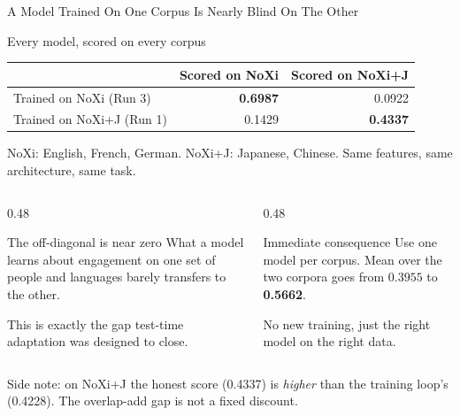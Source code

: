 \documentclass[aspectratio=169]{beamer}
\newcommand{\hl}[1]{\textcolor{coolpurple}{\textbf{#1}}}
\begin{document}
	\begin{frame}{A Model Trained On One Corpus Is Nearly Blind On The Other}
		\begin{block}{Every model, scored on every corpus}
			\small
			\centering
			\begin{tabular}{lrr}
				& \textbf{Scored on NoXi} & \textbf{Scored on NoXi+J} \\
				\hline
				Trained on NoXi (Run 3) & \hl{0.6987} & 0.0922 \\
				Trained on NoXi+J (Run 1) & 0.1429 & \hl{0.4337} \\
			\end{tabular}

			\footnotesize NoXi: English, French, German. NoXi+J: Japanese, Chinese. Same features,
			same architecture, same task.
		\end{block}
		\begin{columns}[onlytextwidth]
			\begin{column}{0.48\textwidth}
				\begin{alertblock}{The off-diagonal is near zero}
					\small
					What a model learns about engagement on one set of people and languages
					barely transfers to the other.

					This is exactly the gap test-time adaptation was designed to close.
				\end{alertblock}
			\end{column}
			\begin{column}{0.48\textwidth}
				\begin{block}{Immediate consequence}
					\small
					Use one model per corpus. Mean over the two corpora goes
					from $0.3955$ to \hl{0.5662}.
					\vspace{0.2em}

					No new training, just the right model on the right data.
				\end{block}
			\end{column}
		\end{columns}
		\vspace{0.1em}
		\centering\footnotesize
		Side note: on NoXi+J the honest score (0.4337) is \emph{higher} than the training
		loop's (0.4228). The overlap-add gap is not a fixed discount.
	\end{frame}
\end{document}
